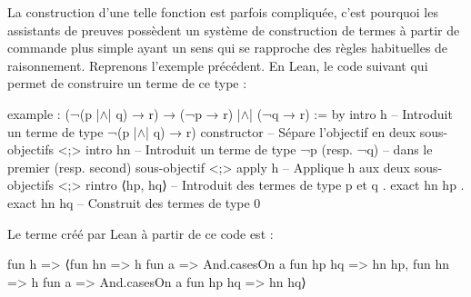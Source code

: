 \documentclass[../../rapport.tex]{subfiles}
\begin{document}
  La construction d'une telle fonction est parfois compliquée, c'est pourquoi les assistants de preuves possèdent
  un système de construction de termes à partir de commande plus simple ayant un sens qui se rapproche des règles habituelles
  de raisonnement.
  Reprenons l'exemple précédent. En Lean, le code suivant qui permet de construire un terme de ce type :
  \begin{lean4code}
    example : (¬(p |$\wedge$| q) → r) → (¬p → r) |$\wedge$| (¬q → r) := by
      intro h 	    -- Introduit un terme de type ¬(p |$\wedge$| q) → r)
      constructor 	-- Sépare l'objectif en deux sous-objectifs
      <;> intro hn        -- Introduit un terme de type ¬p (resp. ¬q)
                          -- dans le premier (resp. second) sous-objectif
      <;> apply h 	-- Applique h aux deux sous-objectifs
      <;> rintro ⟨hp, hq⟩ -- Introduit des termes de type p et q
      . exact hn hp
      . exact hn hq       -- Construit des termes de type 0
  \end{lean4code}
  Le terme créé par Lean à partir de ce code est :
  \begin{lean4code}
    fun h =>
      ⟨fun hn => h fun a => And.casesOn a fun hp hq => hn hp,
       fun hn => h fun a => And.casesOn a fun hp hq => hn hq⟩
  \end{lean4code}
\end{document}

